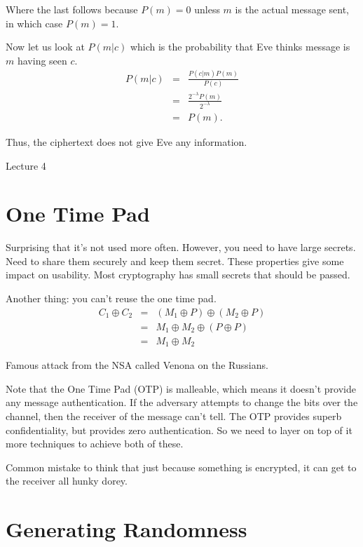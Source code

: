 \documentclass[psamsfonts]{amsart}
\begin{document}
Where the last follows because $P(m) = 0$ unless $m$ is the actual message sent, in which case $P(m) = 1$. 

Now let us look at $P(m|c)$ which is the probability that Eve thinks message is $m$ having seen $c$.
\begin{eqnarray}
P(m|c) &=& \frac{P(c | m) P(m)}{P(c)} \\
&=& \frac{2^{-\lambda} P(m)}{2^{-\lambda}} \\
&=& P(m).
\end{eqnarray}

Thus, the ciphertext does not give Eve any information.

\newpage
\Large{Lecture 4}


\maketitle

\section{One Time Pad}

Surprising that it's not used more often. However, you need to have large secrets. Need to share them securely and keep them secret. These properties give some impact on usability. Most cryptography has small secrets that should be passed. 

Another thing: you can't reuse the one time pad. 
\begin{eqnarray}
C_1 \oplus C_2 &=& (M_1 \oplus P) \oplus (M_2 \oplus P) \\
 &=& M_1 \oplus M_2 \oplus (P \oplus P) \\
 &=& M_1 \oplus M_2
\end{eqnarray}

Famous attack from the NSA called Venona on the Russians. 

Note that the One Time Pad (OTP) is malleable, which means it doesn't provide any message authentication. If the adversary attempts to change the bits over the channel, then the receiver of the message can't tell. The OTP provides superb confidentiality, but provides zero authentication. So we need to layer on top of it more techniques to achieve both of these.

Common mistake to think that just because something is encrypted, it can get to the receiver all hunky dorey.

\section{Generating Randomness}
\end{document}
